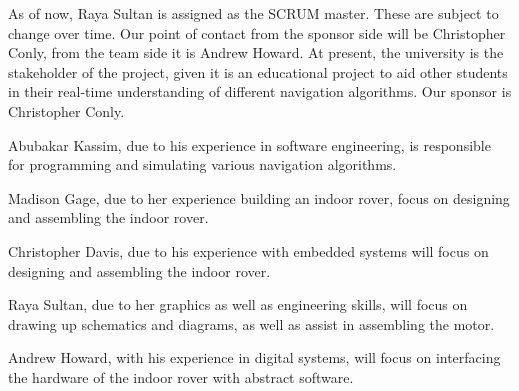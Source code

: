 
As of now, Raya Sultan is assigned as the SCRUM master. These are subject to change over time. Our point of contact from the sponsor side will be Christopher Conly, from the team side it is Andrew Howard. At present, the university is the stakeholder of the project, given it is an educational project to aid other students in their real-time understanding of different navigation algorithms. Our sponsor is Christopher Conly.

Abubakar Kassim, due to his experience in software engineering, is responsible for programming and simulating various navigation algorithms. 

Madison Gage, due to her experience building an indoor rover, focus on designing and assembling the indoor rover.

Christopher Davis, due to his experience with embedded systems will focus on designing and assembling the indoor rover.

Raya Sultan, due to her graphics as well as engineering skills, will focus on drawing up schematics and diagrams, as well as assist in assembling the motor.

Andrew Howard, with his experience in digital systems, will focus on interfacing the hardware of the indoor rover with abstract software.

